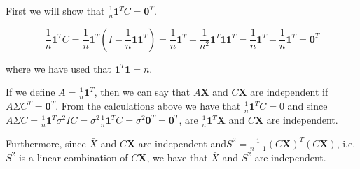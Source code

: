 First we will show that $\frac{1}{n}\textbf{1}^T C = \textbf{0}^T$. 

$$\frac{1}{n}\textbf{1}^T C = \frac{1}{n} \textbf{1}^T \left(I - \frac{1}{n} \textbf{1}\textbf{1}^T\right) = \frac{1}{n} \textbf{1}^T - \frac{1}{n^2} \textbf{1}^T \textbf{1}\textbf{1}^T = \frac{1}{n} \textbf{1}^T - \frac{1}{n} \textbf{1}^T = \textbf{0}^T$$

where we have used that $\textbf{1}^T \textbf{1} = n$.

If we define $A = \frac{1}{n} \textbf{1}^T$, then we can say that $A \textbf{X}$ and $C \textbf{X}$ are independent if $A \Sigma C^T = \textbf{0}^T$. From the calculations above we have that $\frac{1}{n}\textbf{1}^T C = 0$ and since $A\Sigma C =  \frac{1}{n} \textbf{1}^T \sigma^2 I C = \sigma^2 \frac{1}{n} \textbf{1}^TC = \sigma^2 \textbf{0}^T = \textbf{0}^T$, are $\frac{1}{n} \textbf{1}^T \textbf{X}$ and $C\textbf{X}$ are independent. 




Furthermore, since $\bar{X}$ and  $C\textbf{X}$ are independent and$S^2 = \frac{1}{n-1}(C\textbf{X})^T (C\textbf{X})$, i.e. $S^2$ is a linear combination of $C\textbf{X}$, we have that $\bar{X}$ and $S^2$ are independent. 

